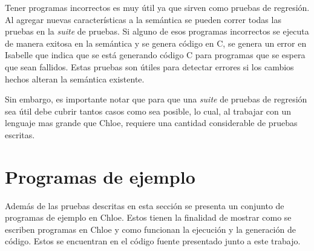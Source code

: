 Tener programas incorrectos es muy útil ya que sirven como pruebas de regresión.
Al agregar nuevas características a la semántica se pueden correr todas las pruebas en la \textit{suite} de pruebas.
Si alguno de esos programas incorrectos se ejecuta de manera exitosa en la semántica y se genera código en C, se genera un error en Isabelle que indica que se está generando código C para programas que se espera que sean fallidos.
Estas pruebas son útiles para detectar errores si los cambios hechos alteran la semántica existente.

Sin embargo, es importante notar que para que una \textit{suite} de pruebas de regresión sea útil debe cubrir tantos casos como sea posible, lo cual, al trabajar con un lenguaje mas grande que Chloe, requiere una cantidad considerable de pruebas escritas.

\section{Programas de ejemplo}

Además de las pruebas descritas en esta sección se presenta un conjunto de programas de ejemplo en Chloe.
Estos tienen la finalidad de mostrar como se escriben programas en Chloe y como funcionan la ejecución y la generación de código.
Estos se encuentran en el código fuente presentado junto a este trabajo.

\begin{comment}
Los programas de ejemplo incluidos en el código fuente son:

\begin{itemize}
  \item{Bubblesort: implementación del algoritmo de ordenamiento bubblesort.}
  \item{Count: implementación de una función que cuenta las ocurrencias de un elemento en un arreglo.}
  \item{Cyclic linked list: implementación de una lista enlazada cíclica.}
  \item{Factorial: implementación de la función factorial.}
  \item{Fibonacci: implementación de una función que calcula el número Fibonacci de un número dado.}
  \item{Linked list: implementación de una lista enlazada.}
  \item{Mergesort: implementación del algoritmo de ordenamiento mergesort.}
  \item{Minimum: implementación de una función que retorna el elemento mínimo de un arreglo.}
  \item{Quicksort: implementación del algoritmo de ordenamiento quicksort.}
  \item{Selectionsort: implementación del algoritmo de ordenamiento selectionsort.}
  \item{String length: implementación de una función que calcula la longitud de una cadena que termina en cero.}
\end{itemize}
\end{comment}

